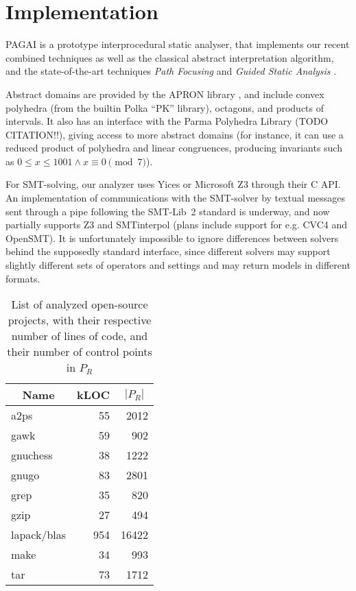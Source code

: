 \documentclass{entcs}
\begin{document}
\section{Implementation}

PAGAI is a prototype interprocedural static analyser, that implements our
recent combined techniques \cite{Henry_Monniaux_Moy_SAS12}
as well as the classical abstract interpretation algorithm, and the state-of-the-art techniques \emph{Path Focusing} \cite{Monniaux_Gonnord_SAS11} and \emph{Guided Static Analysis} \cite{DBLP:conf/sas/GopanR07}.

Abstract domains are provided by the APRON library
\citep{DBLP:conf/cav/JeannetM09}, and include convex polyhedra (from the builtin
Polka ``PK'' library), octagons, and products of intervals. It also has
an interface with the Parma Polyhedra Library (TODO CITATION!!), giving access to
more abstract domains (for instance, it can use a reduced product of polyhedra and linear congruences, producing invariants such as $0 \leq x \leq 1001 \land x \equiv 0 \pmod 7$).

For SMT-solving, our analyzer uses Yices
\cite{DBLP:conf/cav/DutertreM06} or Microsoft Z3\cite{DBLP:conf/tacas/MouraB08}
through their C API.
An implementation of communications with the SMT-solver by textual messages sent through a pipe following the SMT-Lib~2 standard \cite{BarST-SMTLIB,BarST-SMT-10} is underway, and now partially supports Z3 and SMTinterpol (plans include support for e.g. CVC4 and OpenSMT).
It is unfortunately impossible to ignore differences between solvers behind the supposedly standard interface, since different solvers may support slightly different sets of operators and settings and may return models in different formats.

\begin{table}[!h]
	\tiny
	\centering
\begin{tabular}{|l|r|r|} \hline
	\multicolumn{1}{|c|}{Name} &
        \multicolumn{1}{c|}{kLOC} &
        \multicolumn{1}{c|}{$|P_R|$} \\ \hline
	a2ps & 55 & 2012\\
	gawk & 59 & 902\\ 
	gnuchess & 38 & 1222\\ 
	gnugo & 83 & 2801\\
	grep & 35 & 820\\
	gzip & 27 & 494\\
	lapack/blas & 954 & 16422\\
	make & 34 & 993\\ 
	tar & 73 & 1712\\
	\hline
\end{tabular}
\caption{List of analyzed open-source projects, with their respective number of
lines of code, and their number of control points in $P_R$}
\label{fig:projects}
\end{table}
\end{document}
